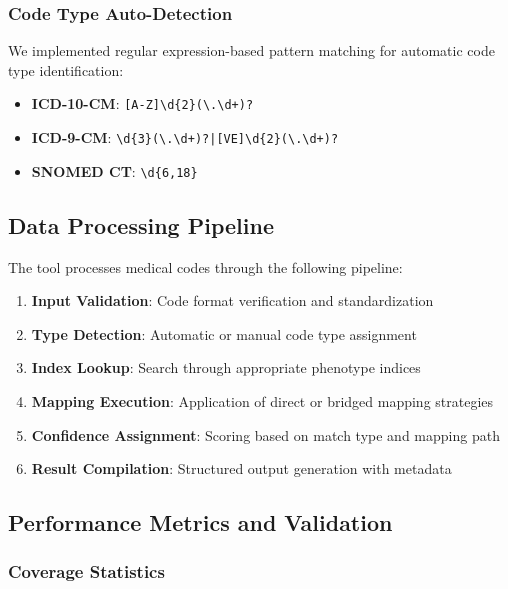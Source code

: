 \documentclass[11pt]{article}
\begin{document}
\subsubsection{Code Type Auto-Detection}

We implemented regular expression-based pattern matching for automatic code type identification:

\begin{itemize}
    \item \textbf{ICD-10-CM}: \texttt{[A-Z]\textbackslash d\{2\}(\textbackslash .\textbackslash d+)?}
    \item \textbf{ICD-9-CM}: \texttt{\textbackslash d\{3\}(\textbackslash .\textbackslash d+)?|[VE]\textbackslash d\{2\}(\textbackslash .\textbackslash d+)?}
    \item \textbf{SNOMED CT}: \texttt{\textbackslash d\{6,18\}}
\end{itemize}

\subsection{Data Processing Pipeline}

The tool processes medical codes through the following pipeline:

\begin{enumerate}
    \item \textbf{Input Validation}: Code format verification and standardization
    \item \textbf{Type Detection}: Automatic or manual code type assignment
    \item \textbf{Index Lookup}: Search through appropriate phenotype indices
    \item \textbf{Mapping Execution}: Application of direct or bridged mapping strategies
    \item \textbf{Confidence Assignment}: Scoring based on match type and mapping path
    \item \textbf{Result Compilation}: Structured output generation with metadata
\end{enumerate}

\subsection{Performance Metrics and Validation}

\subsubsection{Coverage Statistics}
\end{document}
